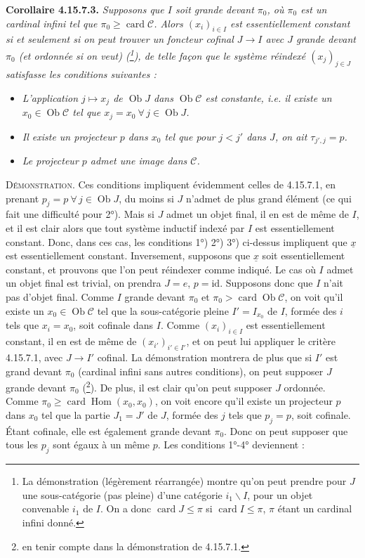 \documentclass[11pt]{article}
\newcommand{\printedpage}[1]{\marginpar{\footnotesize p.~#1}}
\newcommand{\msp}[1]{\marginpar{\footnotesize [#1]}}
\newcommand{\ux}{\underline{x}}
\newcommand{\cC}{\mathcal{C}}
\newcommand{\Ob}{\operatorname{Ob}}
\newcommand{\card}{\operatorname{card}}
\newcommand{\id}{\mathrm{id}}
\newcommand{\Hom}{\operatorname{Hom}}
\begin{document}
\printedpage{170}
\msp{page 443}
\textbf{Corollaire 4.15.7.3.} \textit{Supposons que $I$ soit grande devant $\pi_0$, où $\pi_0$ est un cardinal infini tel que $\pi_0 \geqslant \card \cC$. Alors $(x_i)_{i\in I}$ est essentiellement constant si et seulement si on peut trouver un foncteur cofinal $J \longrightarrow I$ avec $J$ grande devant $\pi_0$ (et ordonnée si on veut) (\footnote{La démonstration (légèrement réarrangée) montre qu'on peut prendre pour $J$ une sous-catégorie (pas pleine) d'une catégorie $i_1\backslash I$, pour un objet convenable $i_1$ de $I$. On a donc $\card J \leqslant \pi$ si $\card I \leqslant \pi$, $\pi$ étant un cardinal infini donné.}), de telle façon que le système réindexé $(x_j)_{j\in J}$ satisfasse les conditions suivantes :}
\begin{itemize}
\item[\textit{1°)}] \textit{L'application $j \longmapsto x_j$ de $\Ob J$ dans $\Ob\cC$ est constante, i.e. il existe un $x_0 \in \Ob\cC$ tel que $x_j = x_0\ \forall\, j \in \Ob J$.}
\item[\textit{2°)}] \textit{Il existe un projecteur $p$ dans $x_0$ tel que pour $j < j'$ dans $J$, on ait $\tau_{j',j} = p$.}
\item[\textit{3°)}] \textit{Le projecteur $p$ admet une image dans $\cC$.}
\end{itemize}
\textsc{Démonstration}. Ces conditions impliquent évidemment celles de 4.15.7.1, en prenant $p_j = p\ \forall\, j \in \Ob J$, du moins si $J$ n'admet de plus grand élément (ce qui fait une difficulté pour 2°). Mais si $J$ admet un objet final, il en est de même de $I$, et il est clair alors que tout système inductif indexé par $I$ est essentiellement constant. Donc, dans ces cas, les conditions 1°) 2°) 3°) ci-dessus impliquent que $\ux$ est essentiellement constant. Inverse\msp{page 444}ment, supposons que $\ux$ soit essentiellement constant, et prouvons que l'on peut réindexer comme indiqué. Le cas où $I$ admet un objet final est trivial, on prendra $J = e$, $p = \id$. Supposons donc que $I$ n'ait pas d'objet final. Comme $I$ grande devant $\pi_0$ et $\pi_0 > \card\Ob\cC$, on voit qu'il existe un $x_0 \in \Ob\cC$ tel que la sous-catégorie pleine $I' = I_{x_0}$ de $I$, formée des $i$ tels que $x_i = x_0$, soit cofinale dans $I$. Comme $(x_i)_{i\in I}$ est essentiellement constant, il en est de même de $(x_{i'})_{i'\in I'}$, et on peut lui appliquer le critère 4.15.7.1, avec \marginpar{$\Vert$}%
$J \longrightarrow I'$ cofinal. La démonstration montrera de plus que si $I'$ est grand devant $\pi_0$ (cardinal infini sans autres conditions), on peut supposer $J$ grande devant $\pi_0$ (\footnote{en tenir compte dans la démonstration de 4.15.7.1.}). De plus, il est clair qu'on peut supposer $J$ ordonnée. Comme $\pi_0 \geqslant \card\Hom(x_0,x_0)$, on voit encore qu'il existe un projecteur $p$ dans $x_0$ tel que la partie $J_1 = J'$ de $J$, formée des $j$ tels que $p_j = p$, soit cofinale. Étant cofinale, elle est également grande devant $\pi_0$. Donc on peut supposer que tous les $p_j$ sont égaux à un même $p$. Les conditions 1°-4° deviennent :
\end{document}
